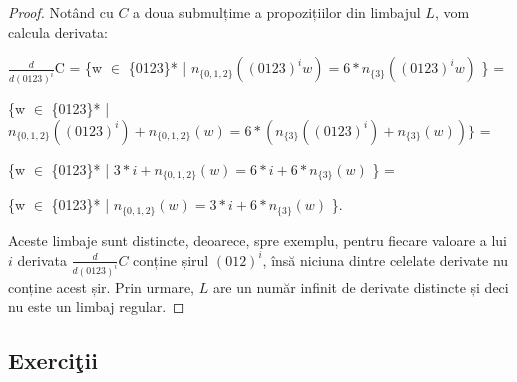 \begin{proof}
Notând cu $C$ a doua submulțime a propozițiilor din limbajul $L$, vom calcula derivata:

$\frac{d}{d(0123)^{i}}$C = \{w $\in$ \{0123\}* | $n_{\{0,1,2\}}((0123)^{i}w) = 6*n_{\{3\}}((0123)^iw)$ \} = 

\{w $\in$ \{0123\}* | $n_{\{0,1,2\}}((0123)^{i}) + n_{\{0,1,2\}}(w) = 6*(n_{\{3\}}((0123)^{i}) +  n_{\{3\}}(w)) \}$ =

\{w $\in$ \{0123\}* | $3*i + n_{\{0,1,2\}}(w) = 6*i + 6*n_{\{3\}}(w)$ \} =

\{w $\in$ \{0123\}* | $n_{\{0,1,2\}}(w)  = 3*i + 6*n_{\{3\}}(w)$ \}.

Aceste limbaje sunt distincte, deoarece, spre exemplu, pentru fiecare valoare a lui $i$ derivata $\frac{d}{d(0123)^{i}}C$ conține șirul $(012)^i$, însă niciuna dintre celelate derivate nu conține acest șir. Prin urmare, $L$ are un număr infinit de derivate distincte și deci nu este un limbaj regular.
\end{proof}

\subsection{Exerciţii}

